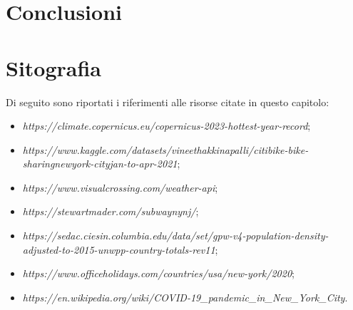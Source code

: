 \section{Conclusioni}

\section{Sitografia}
\label{sitografia_capitolo_4}
Di seguito sono riportati i riferimenti alle risorse citate in questo capitolo:
\begin{itemize}
	\item \textit{https://climate.copernicus.eu/copernicus-2023-hottest-year-record};
	\item \textit{https://www.kaggle.com/datasets/vineethakkinapalli/citibike-bike-sharingnewyork-cityjan-to-apr-2021};
	\item \textit{https://www.visualcrossing.com/weather-api};
	\item \textit{https://stewartmader.com/subwaynynj/};
	\item \textit{https://sedac.ciesin.columbia.edu/data/set/gpw-v4-population-density-adjusted-to-2015-unwpp-country-totals-rev11};
	\item \textit{https://www.officeholidays.com/countries/usa/new-york/2020};
	\item \textit{https://en.wikipedia.org/wiki/COVID-19\_pandemic\_in\_New\_York\_City}.
\end{itemize}
